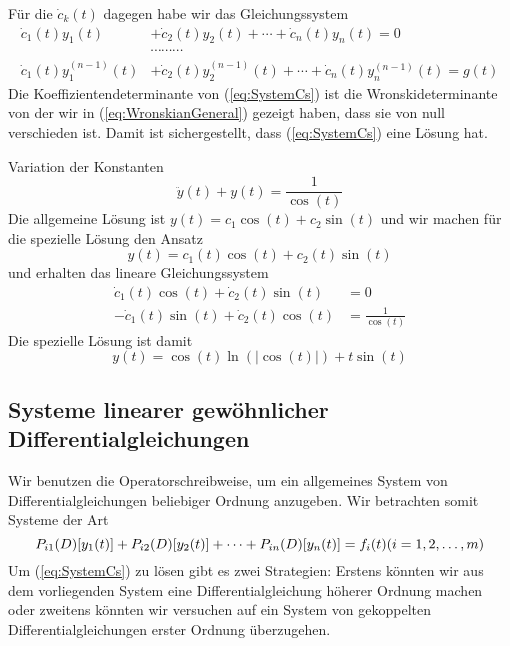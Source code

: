 Für die $\dot{c}_k(t)$ dagegen habe wir das Gleichungssystem
\begin{align}
  \dot{c}_1(t)y_1(t)&+\dot{c}_2(t)y_2(t)+\cdots+\dot{c}_n(t)y_n(t)=0\nonumber\\
	       &\cdots\cdots\cdots\nonumber\\
  \dot{c}_1(t)y^{(n-1)}_1(t)&+\dot{c}_2(t)y^{(n-1)}_2(t)+\cdots
  +\dot{c}_n(t)y^{(n-1)}_n(t)=g(t)
	       \label{eq:SystemCs}
\end{align}
Die Koeffizientendeterminante von (\ref{eq:SystemCs}) ist die
Wronskideterminante von der wir in (\ref{eq:WronskianGeneral}) gezeigt haben,
dass sie von null verschieden ist. Damit ist sichergestellt, dass
(\ref{eq:SystemCs}) eine Lösung hat.
%
\begin{example}{Variation der Konstanten}
  \[\ddot{y}(t)+y(t)=\frac{1}{\cos(t)}\]
  Die allgemeine Lösung ist $y(t)=c_1\cos(t)+c_2\sin(t)$ und wir machen für die
  spezielle Lösung den Ansatz
  \[y(t)=c_1(t)\cos(t)+c_2(t)\sin(t)\]
  und erhalten das lineare Gleichungssystem
  \begin{align*}
    \dot{c}_1(t)\cos(t)+\dot{c}_2(t)\sin(t)&=0\\
    -\dot{c}_1(t)\sin(t)+\dot{c}_2(t)\cos(t)&=\frac{1}{\cos(t)}
  \end{align*}
  Die spezielle Lösung ist damit
  \[y(t)=\cos(t)\ln(|\cos(t)|)+t\sin(t)\]
\end{example}
%
\pagebreak 
%
\subsection{Systeme linearer gewöhnlicher Differentialgleichungen}
Wir benutzen die Operatorschreibweise, um ein allgemeines System von
Differentialgleichungen beliebiger Ordnung anzugeben. Wir betrachten somit
Systeme der Art
\begin{equation}
  P_{i1}(D)[y_1(t)]+P_{i2}(D)[y_2(t)]+\dots+P_{in}(D)[y_n(t)]=f_i(t)\hfill
  (i=1,2,\dots,m)
  \label{eq:SystemGeneral}
\end{equation}
Um (\ref{eq:SystemCs}) zu lösen gibt es zwei Strategien: Erstens könnten wir
aus dem vorliegenden System eine Differentialgleichung höherer Ordnung machen
oder zweitens könnten wir versuchen auf ein System von gekoppelten
Differentialgleichungen erster Ordnung überzugehen.


